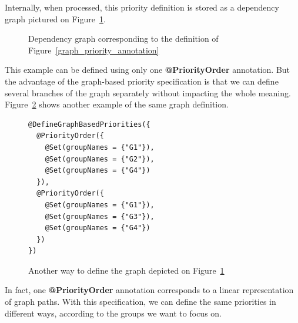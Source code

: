 \documentclass[11pt]{report}
\begin{document}
Internally, when processed, this priority definition is stored as a dependency graph pictured on Figure~\ref{fig:graph}.
\begin{figure}[!ht]
      \caption{Dependency graph corresponding to the definition of Figure~\ref{graph_priority_annotation}}
      \label{fig:graph} 
\end{figure}
This example can be defined using only one \textbf{@PriorityOrder} annotation. But the advantage of the graph-based priority specification is that we can define several branches of the graph separately without impacting the whole meaning. Figure~\ref{graph_priority_definition_2} shows another example of the same graph definition.

\begin{figure}[!ht]
	\lstset{language=java, numbers=left, numberstyle=\tiny, stepnumber=1, numbersep=5pt, basicstyle=\footnotesize}
	\begin{lstlisting}[frame=single]
@DefineGraphBasedPriorities({
  @PriorityOrder({
    @Set(groupNames = {"G1"}),
    @Set(groupNames = {"G2"}),
    @Set(groupNames = {"G4"})
  }),
  @PriorityOrder({
    @Set(groupNames = {"G1"}),
    @Set(groupNames = {"G3"}),
    @Set(groupNames = {"G4"})
  })
})
 	\end{lstlisting}
\caption{Another way to define the graph depicted on Figure~\ref{fig:graph}}
\label{graph_priority_definition_2}
\end{figure}

In fact, one \textbf{@PriorityOrder} annotation corresponds to a linear representation of graph paths. With this specification, we can define the same priorities in different ways, according to the groups we want to focus on.
\end{document}
